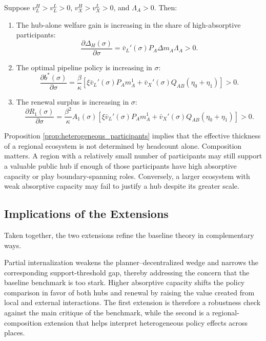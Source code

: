 \begin{proposition}
\label{prop:heterogeneous_participants}
Suppose $v_L^H>v_L^L>0$, $v_X^H>v_X^L>0$, and $\Lambda_A>0$. Then:

\begin{enumerate}[leftmargin=2em]
    \item The hub-alone welfare gain is increasing in the share of high-absorptive participants:
    \begin{equation}
    \frac{\partial \Delta_H(\sigma)}{\partial \sigma}
    =
    \bar v_L'(\sigma)P_A\Delta m_A\Lambda_A
    >0.
    \label{eq:dDeltaH_dsigma}
    \end{equation}

    \item The optimal pipeline policy is increasing in $\sigma$:
    \begin{equation}
    \frac{\partial b^*(\sigma)}{\partial \sigma}
    =
    \frac{\beta}{\kappa}
    \left[
    \xi \bar v_L'(\sigma)P_A m_A^1
    +
    \bar v_X'(\sigma)Q_{AB}(\eta_0+\eta_1)
    \right]
    >0.
    \label{eq:dbstar_dsigma}
    \end{equation}

    \item The renewal surplus is increasing in $\sigma$:
    \begin{equation}
    \frac{\partial R_1(\sigma)}{\partial \sigma}
    =
    \frac{\beta^2}{\kappa}
    A_1(\sigma)
    \left[
    \xi \bar v_L'(\sigma)P_A m_A^1
    +
    \bar v_X'(\sigma)Q_{AB}(\eta_0+\eta_1)
    \right]
    >0.
    \label{eq:dR_dsigma}
    \end{equation}
\end{enumerate}
\end{proposition}

Proposition \ref{prop:heterogeneous_participants} implies that the effective thickness of a regional ecosystem is not determined by headcount alone. Composition matters. A region with a relatively small number of participants may still support a valuable public hub if enough of those participants have high absorptive capacity or play boundary-spanning roles. Conversely, a larger ecosystem with weak absorptive capacity may fail to justify a hub despite its greater scale.

\subsection{Implications of the Extensions}

Taken together, the two extensions refine the baseline theory in complementary ways.

Partial internalization weakens the planner--decentralized wedge and narrows the corresponding support-threshold gap, thereby addressing the concern that the baseline benchmark is too stark. Higher absorptive capacity shifts the policy comparison in favor of both hubs and renewal by raising the value created from local and external interactions. The first extension is therefore a robustness check against the main critique of the benchmark, while the second is a regional-composition extension that helps interpret heterogeneous policy effects across places.

